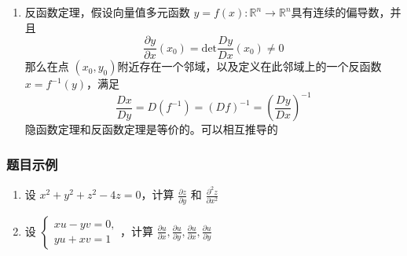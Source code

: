 \begin{enumerate}
    \item 反函数定理，假设向量值多元函数 $y=f(x): \mathbb{R} ^n \to \mathbb{R} ^n$具有连续的偏导数，并且
    $$
    \frac{\partial y}{\partial x} (x_0) = \mathrm{det} \frac{D y}{D x}(x_0) \neq 0
    $$
    那么在点 $(x_0, y_0)$附近存在一个邻域，以及定义在此邻域上的一个反函数 $x = f^{-1}(y)$，满足
    $$
    \frac{Dx}{Dy}=D(f^{-1})=(Df)^{-1}=\left(\frac{Dy}{Dx}\right)^{-1}
    $$
    隐函数定理和反函数定理是等价的。可以相互推导的
\end{enumerate}

\subsubsection{题目示例}
\begin{enumerate}
    \item 设 $x^2 + y^2 + z^2 -4z =0$，计算 $\frac{\partial z}{\partial y}$ 和 $\frac{\partial ^2 z}{\partial x ^2}$
    
    \item 设 $\begin{cases} x u -yv=0,\\ yu + x v= 1 \end{cases}$，计算 $\frac{\partial u}{\partial x}, \frac{\partial u}{\partial y}, \frac{\partial u}{\partial x}, \frac{\partial u}{\partial y}$
\end{enumerate}

